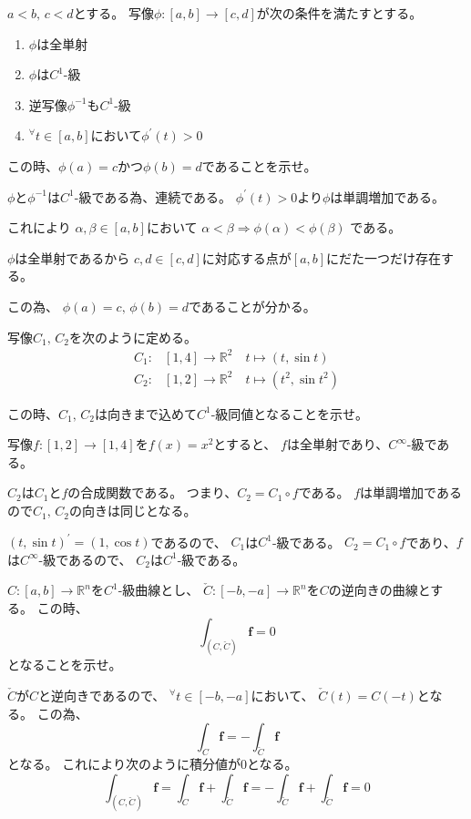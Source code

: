 \documentclass[12pt,b5paper]{ltjsarticle}
\begin{document}
\hrulefill

$a<b,\,c<d$とする。
写像$\phi:[a,b]\to[c,d]$が次の条件を満たすとする。
\begin{enumerate}
 \item $\phi$は全単射
 \item $\phi$は$C^1$-級
 \item 逆写像$\phi^{-1}$も$C^1$-級
 \item ${}^{\forall}t\in[a,b]$において$\phi^{\prime}(t)>0$
\end{enumerate}
この時、$\phi(a)=c$かつ$\phi(b)=d$であることを示せ。

\dotfill

$\phi$と$\phi^{-1}$は$C^1$-級である為、連続である。
$\phi^\prime(t)>0$より$\phi$は単調増加である。

これにより
$\alpha,\beta \in [a,b]$において
$\alpha < \beta \Rightarrow \phi(\alpha) < \phi(\beta)$
である。

$\phi$は全単射であるから
$c,d\in [c,d]$に対応する点が$[a,b]$にだた一つだけ存在する。

この為、
$\phi(a)=c,\,\phi(b)=d$であることが分かる。

\hrulefill

写像$C_1,\,C_2$を次のように定める。
\begin{align}
 C_1:& [1,4] \to \mathbb{R}^2 \quad t \mapsto (t,\sin t)\\
 C_2:& [1,2] \to \mathbb{R}^2 \quad t \mapsto (t^2,\sin t^2)
\end{align}

この時、$C_1,\,C_2$は向きまで込めて$C^1$-級同値となることを示せ。

\dotfill

写像$f:[1,2]\to[1,4]$を$f(x)=x^2$とすると、
$f$は全単射であり、$C^{\infty}$-級である。

$C_2$は$C_1$と$f$の合成関数である。
つまり、$C_2=C_1\circ f$である。
$f$は単調増加であるので$C_1,\,C_2$の向きは同じとなる。

$(t,\sin t)^\prime = (1,\cos t)$であるので、
$C_1$は$C^1$-級である。
$C_2=C_1\circ f$であり、$f$は$C^\infty$-級であるので、
$C_2$は$C^1$-級である。

\hrulefill

$C:[a,b]\to\mathbb{R}^n$を$C^1$-級曲線とし、
$\check{C}:[-b,-a]\to\mathbb{R}^n$を$C$の逆向きの曲線とする。
この時、
\begin{equation}
 \int_{(C,\check{C})}\bm{f} =0
\end{equation}
となることを示せ。

\dotfill

$\check{C}$が$C$と逆向きであるので、
${}^{\forall}t\in [-b,-a]$において、
$\check{C}(t)=C(-t)$となる。
この為、
\begin{equation}
 \int_C \bm{f} = -\int_{\check{C}} \bm{f}
\end{equation}
となる。
これにより次のように積分値が$0$となる。
\begin{equation}
 \int_{(C,\check{C})}\bm{f} = \int_C \bm{f} + \int_{\check{C}} \bm{f}
  = -\int_{\check{C}} \bm{f} + \int_{\check{C}} \bm{f} =0
\end{equation}
\end{document}
